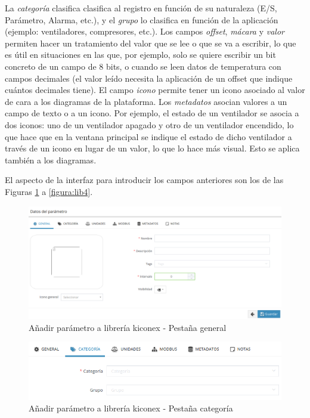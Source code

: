 La \textit{categoría} clasifica clasifica al registro en función de su naturaleza (E/S, Parámetro, Alarma, etc.), y el \textit{grupo} lo clasifica en función de la aplicación (ejemplo: ventiladores, compresores, etc.). Los campos \textit{offset}, \textit{mácara} y \textit{valor} permiten hacer un tratamiento del valor que se lee o que se va a escribir, lo que es útil en situaciones en las que, por ejemplo, solo se quiere escribir un bit concreto de un campo de 8 bits, o cuando se leen datos de temperatura con campos decimales (el valor leído necesita la aplicación de un offset que indique cuántos decimales tiene).
El campo \textit{icono} permite tener un icono asociado al valor de cara a los diagramas de la plataforma.
Los \textit{metadatos} asocian valores a un campo de texto o a un icono. Por ejemplo, el estado de un ventilador se asocia a dos iconos: uno de un ventilador apagado y otro de un ventilador encendido, lo que hace que en la ventana principal se indique el estado de dicho ventilador a través de un icono en lugar de un valor, lo que lo hace más visual. Esto se aplica también a los diagramas. 

\hspace{1em}

El aspecto de la interfaz  para introducir los campos anteriores son los de las Figuras \hyperref[figura:lib0]{\ref{figura:lib0}} a \hyperref[figura:lib4]{\ref{figura:lib4}}.

\begin{figure}[H]
  \centering
  \includegraphics[width=\textwidth, keepaspectratio]{img/lib0}
  \caption{Añadir parámetro a librería kiconex - Pestaña general}
  \label{figura:lib0}
\end{figure}

\begin{figure}[H]
  \centering
  \includegraphics[width=\textwidth, keepaspectratio]{img/lib1}
  \caption{Añadir parámetro a librería kiconex - Pestaña categoría}
  \label{figura:lib1}
\end{figure}


